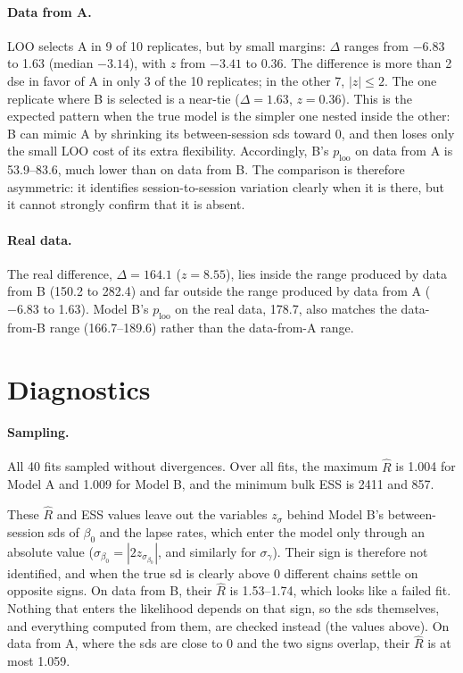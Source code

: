 \documentclass[11pt]{article}
\begin{document}
\paragraph{Data from A.} LOO selects A in 9 of 10 replicates, but by small margins:
$\Delta$ ranges from $-6.83$ to 1.63 (median $-3.14$), with $z$ from $-3.41$ to 0.36.
The difference is more than 2 dse in favor of A in only 3 of the 10 replicates; in the
other 7, $|z| \le 2$. The one replicate where B is selected is a near-tie
($\Delta = 1.63$, $z = 0.36$). This is the expected pattern when the true model is
the simpler one nested inside the other: B can mimic A by shrinking its
between-session sds toward 0, and then loses only the small LOO cost of its extra
flexibility. Accordingly, B's $p_\text{loo}$ on data from A is 53.9--83.6, much lower
than on data from B. The comparison is therefore asymmetric: it identifies
session-to-session variation clearly when it is there, but it cannot strongly
confirm that it is absent.

\paragraph{Real data.} The real difference, $\Delta = 164.1$ ($z = 8.55$), lies inside
the range produced by data from B (150.2 to 282.4) and far outside the range produced
by data from A ($-6.83$ to 1.63). Model B's $p_\text{loo}$ on the real data, 178.7,
also matches the data-from-B range (166.7--189.6) rather than the data-from-A range.

\section{Diagnostics}

\paragraph{Sampling.} All 40 fits sampled without divergences. Over all fits, the
maximum $\hat{R}$ is 1.004 for Model A and 1.009 for Model B, and the minimum bulk ESS
is 2411 and 857.

These $\hat{R}$ and ESS values leave out the variables $z_{\sigma}$ behind Model B's
between-session sds of $\beta_0$ and the lapse rates, which enter the model only
through an absolute value ($\sigma_{\beta_0} = |2 z_{\sigma_{\beta_0}}|$, and similarly
for $\sigma_\gamma$). Their sign is therefore not identified, and when the true sd is
clearly above 0 different chains settle on opposite signs. On data from B, their
$\hat{R}$ is 1.53--1.74, which looks like a failed fit. Nothing that enters the
likelihood depends on that sign, so the sds themselves, and everything computed
from them, are checked instead (the values above). On data from A, where the sds are
close to 0 and the two signs overlap, their $\hat{R}$ is at most 1.059.
\end{document}
